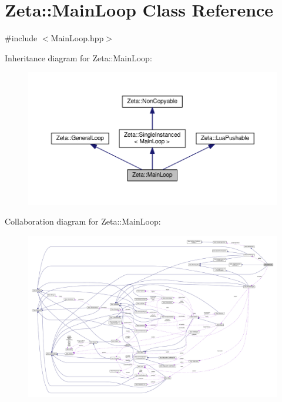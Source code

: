 \hypertarget{classZeta_1_1MainLoop}{\section{Zeta\+:\+:Main\+Loop Class Reference}
\label{classZeta_1_1MainLoop}
}


{\ttfamily \#include $<$Main\+Loop.\+hpp$>$}



Inheritance diagram for Zeta\+:\+:Main\+Loop\+:\nopagebreak
\begin{figure}[H]
\begin{center}
\leavevmode
\includegraphics[width=350pt]{classZeta_1_1MainLoop__inherit__graph}
\end{center}
\end{figure}


Collaboration diagram for Zeta\+:\+:Main\+Loop\+:
\nopagebreak
\begin{figure}[H]
\begin{center}
\leavevmode
\includegraphics[width=350pt]{classZeta_1_1MainLoop__coll__graph}
\end{center}
\end{figure}
